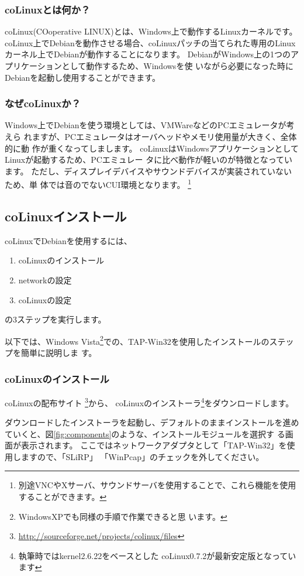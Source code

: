 \documentclass[mingoth,a4paper]{jsarticle}
\begin{document}
\subsubsection{coLinuxとは何か？}
coLinux(COoperative LINUX)とは、Windows上で動作するLinuxカーネルです。
coLinux上でDebianを動作させる場合、coLinuxパッチの当てられた専用のLinux
カーネル上でDebianが動作することになります。
DebianがWindows上の1つのアプリケーションとして動作するため、Windowsを使
いながら必要になった時にDebianを起動し使用することができます。

\subsubsection{なぜcoLinuxか？}
Windows上でDebianを使う環境としては、VMWareなどのPCエミュレータが考えら
れますが、PCエミュレータはオーバヘッドやメモリ使用量が大きく、全体的に動
作が重くなってしまします。
coLinuxはWindowsアプリケーションとしてLinuxが起動するため、PCエミュレー
タに比べ動作が軽いのが特徴となっています。
ただし、ディスプレイデバイスやサウンドデバイスが実装されていないため、単
体では音のでないCUI環境となります。
\footnote{別途VNCやXサーバ、サウンドサーバを使用することで、これら機能を使用することができます。}

\subsection{coLinuxインストール}
coLinuxでDebianを使用するには、
\begin{enumerate}
\item coLinuxのインストール
\item networkの設定
\item coLinuxの設定
\end{enumerate}
の3ステップを実行します。

以下では、Windows Vista\footnote{WindowsXPでも同様の手順で作業できると思
います。}での、TAP-Win32を使用したインストールのステップを簡単に説明しま
す。


\subsubsection{coLinuxのインストール}
coLinuxの配布サイト
\footnote{\url{http://sourceforge.net/projects/colinux/files}}から、
coLinuxのインストーラ\footnote{執筆時ではkernel2.6.22をベースとした
coLinux0.7.2が最新安定版となっています}をダウンロードします。

ダウンロードしたインストーラを起動し、デフォルトのままインストールを進め
ていくと、図\ref{fig:components}のような、インストールモジュールを選択す
る画面が表示されます。
ここではネットワークアダプタとして「TAP-Win32」を使用しますので、「SLiRP」
「WinPcap」のチェックを外してください。
\end{document}
